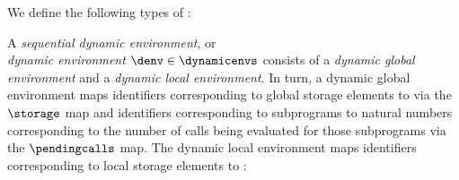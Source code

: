 We define the following types of \nativevaluesterm{}:


\begin{definition}
A \emph{sequential dynamic environment}, or \\ \emph{dynamic environment}
$\denv \in \dynamicenvs$
consists of a \emph{dynamic global environment} and a \emph{dynamic local environment}.
\hypertarget{def-pending-calls}{}
\hypertarget{def-storage}{}
In turn, a dynamic global environment maps identifiers corresponding to global storage elements to \nativevaluesterm{}
via the $\storage$ map and identifiers corresponding to subprograms to natural numbers corresponding
to the number of calls being evaluated for those subprograms via the $\pendingcalls$ map.
The dynamic local environment maps identifiers corresponding to local storage elements to \nativevaluesterm{}:


\end{definition}


